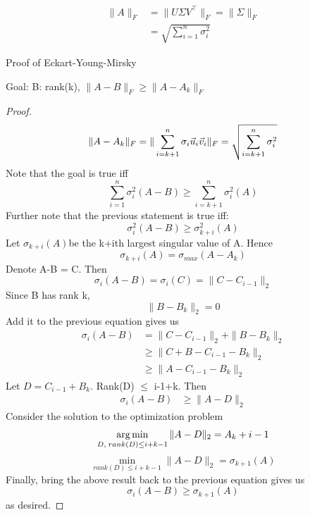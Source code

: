 \begin{remark}
\begin{align*}
	\|A\|_F &= \|U \Sigma V^\top\|_F = \|\Sigma\|_F\\
	&=\sqrt{\sum_{i=1}^n \sigma_i^2}
\end{align*}
\end{remark}

\newpage
Proof of Eckart-Young-Mirsky

Goal: B: rank(k), $\|A-B\|_F \ge \|A-A_k\|_F$

\begin{proof}
\[
\|A-A_k\|_F = \|\sum_{i=k+1}^n \sigma_i\vec{u}_i\vec{v}_i\|_F = \sqrt{\sum_{i=k+1}^n \sigma_i^2}
\]
Note that the goal is true iff
\[
\sum_{i=1}^n \sigma_i^2(A-B) \ge \sum_{i=k+1}^n \sigma_i^2(A)
\]
Further note that the previous statement is true iff:
\[
\sigma_i^2(A-B) \ge \sigma_{k+i}^2(A)
\]
Let $\sigma_{k+i}(A)$be the k+ith largest singular value of A. Hence
\[
\sigma_{k+i}(A) = \sigma_{max}(A-A_k)
\]
Denote A-B = C. Then
\[
\sigma_i(A-B) = \sigma_i(C) = \|C-C_{i-1}\|_2
\]
Since B has rank k,
\[
\|B-B_k\|_2 = 0
\]
Add it to the previous equation gives us
\begin{align*}
	\sigma_i(A-B) &= \|C-C_{i-1}\|_2 + \|B-B_k\|_2\\
	&\ge \|C+B-C_{i-1}-B_k\|_2\\
	&\ge \|A-C_{i-1}-B_k\|_2
\end{align*}
Let $D = C_{i-1}+B_k$. Rank(D) $\le$ i-1+k. Then
\begin{align*}
	\sigma_i(A-B) &\ge \|A-D\|_2
\end{align*}
Consider the solution to the optimization problem
\[
\operatorname*{arg\,min}_{D, \;rank(D)\le i+k-1}\|A-D\|_2=A_k+i-1
\]
\[
\min_{rank(D)\le i+k-1}\|A-D\|_2 = \sigma_{k+1}(A)
\]
Finally, bring the above result back to the previous equation gives us
\[
\sigma_i(A-B) \ge \sigma_{k+1}(A)
\]
as desired.
\end{proof}



